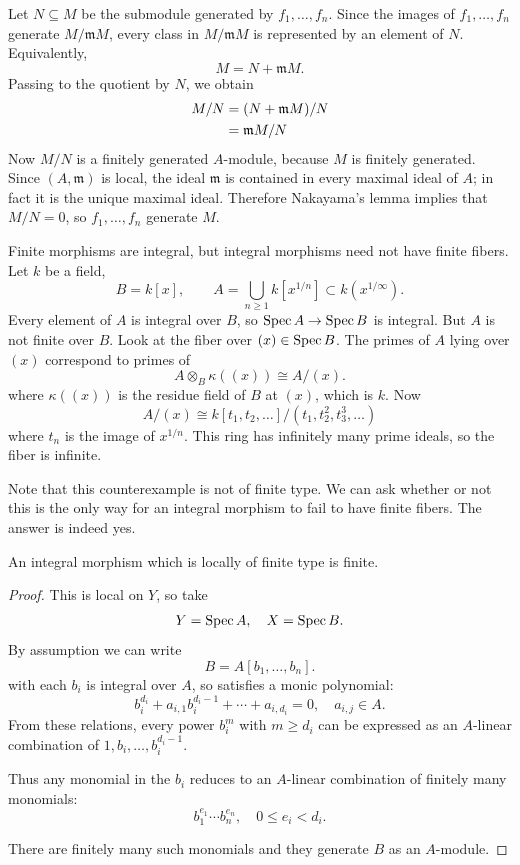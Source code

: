 \documentclass[12pt]{article}
\begin{document}
\begin{solution}
    Let $N \subseteq M$ be the submodule generated by $f_1,\dots,f_n$. Since the images of $f_1,\dots,f_n$ generate $M/\mathfrak m M$, every class in $M/\mathfrak m M$ is represented by an element of $N$. Equivalently,
    \[
        M = N + \mathfrak m M.
    \]
    Passing to the quotient by $N$, we obtain \begin{align*}
        M/N & = (N + \mathfrak m M)/N \\
            & = \mathfrak{m} M/N
    \end{align*}
    Now $M/N$ is a finitely generated $A$-module, because $M$ is finitely generated. Since $(A,\mathfrak m)$ is local, the ideal $\mathfrak m$ is contained in every maximal ideal of $A$; in fact it is the unique maximal ideal. Therefore Nakayama's lemma implies that $M/N=0$, so $f_1,\dots,f_n$ generate $M$.
\end{solution}

\begin{example}
    Finite morphisms are integral, but integral morphisms need not have finite fibers. Let $k$ be a field,
    \[
        B = k[x], \qquad A = \bigcup_{n\ge 1} k[x^{1/n}] \subset k(x^{1/\infty}).
    \]
    Every element of $A$ is integral over $B$, so $\operatorname{Spec} A \to \operatorname{Spec} B$ is integral. But $A$ is not finite over $B$. Look at the fiber over $(x)\in\operatorname{Spec} B$. The primes of $A$ lying over $(x)$ correspond to primes of
    \[
        A\otimes_B \kappa((x)) \cong A/(x).
    \] where $\kappa((x))$ is the residue field of $B$ at $(x)$, which is $k$.
    Now
    \[
        A/(x) \cong k[t_1,t_2,\dots]/(t_1, t_2^2, t_3^3,\dots)
    \]
    where $t_n$ is the image of $x^{1/n}$. This ring has infinitely many prime ideals, so the fiber is infinite.
\end{example}

Note that this counterexample is not of finite type. We can ask whether or not this is the only way for an integral morphism to fail to have finite fibers. The answer is indeed yes.

\begin{proposition}
    An integral morphism which is locally of finite type is finite.
\end{proposition}

\begin{proof}
    This is local on $Y$, so take
    \[
        Y = \operatorname{Spec} A, \quad X = \operatorname{Spec} B.
    \]
    By assumption we can write
    \[
        B = A[b_1, \dots, b_n].
    \]
    with each $b_i$ is integral over $A$, so satisfies a monic polynomial:
    \[
        b_i^{d_i} + a_{i,1} b_i^{d_i-1} + \cdots + a_{i,d_i} = 0, \quad a_{i,j} \in A.
    \]
    From these relations, every power $b_i^m$ with $m \ge d_i$ can be expressed as an $A$-linear combination of $1, b_i, \dots, b_i^{d_i-1}$.

    Thus any monomial in the $b_i$ reduces to an $A$-linear combination of finitely many monomials:
    \[
        b_1^{e_1} \cdots b_n^{e_n}, \quad 0 \le e_i < d_i.
    \]

    There are finitely many such monomials and they generate $B$ as an $A$-module.
\end{proof}
\end{document}

